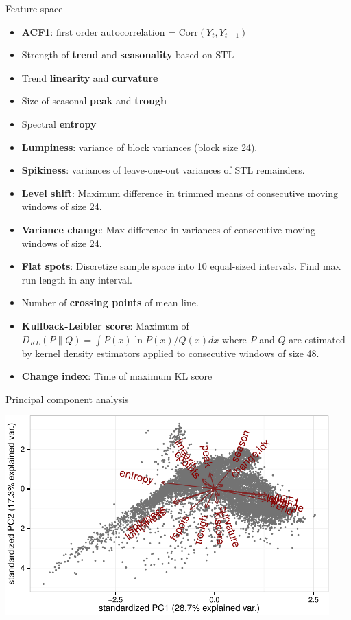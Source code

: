 \documentclass[14pt]{beamer}
\begin{document}
\begin{frame}{Feature space}\fontsize{10}{11}\sf\vspace*{-0.2cm}
\begin{itemize}
\item \textbf{ACF1}: first order autocorrelation = $\text{Corr}(Y_t,Y_{t-1})$
\item Strength of \textbf{trend} and \textbf{seasonality} based on STL
\item Trend \textbf{linearity} and \textbf{curvature}
\item Size of seasonal \textbf{peak} and \textbf{trough}
\item Spectral \textbf{entropy}
\item \textbf{Lumpiness}: variance of block variances (block size 24).
\item \textbf{Spikiness}: variances of leave-one-out variances of STL remainders.
\item \textbf{Level shift}: Maximum difference in trimmed means of consecutive moving windows of size 24.
\item \textbf{Variance change}: Max difference in variances of consecutive moving windows of size 24.
\item \textbf{Flat spots}: Discretize sample space into 10 equal-sized intervals. Find max run length in any interval.
\item Number of \textbf{crossing points} of mean line.
 \item \textbf{Kullback-Leibler score}:
      Maximum of $        D_{KL}(P\|Q) = \int P(x)\ln P(x)/ Q(x) dx$
       where $P$ and $Q$ are estimated by kernel density estimators applied to
       consecutive windows of size 48.
\item \textbf{Change index}: Time of maximum KL score
\end{itemize}
\end{frame}

\begin{frame}{Principal component analysis}
\centerline{\includegraphics[width=12.5cm]{pca}}
\end{frame}
\end{document}

